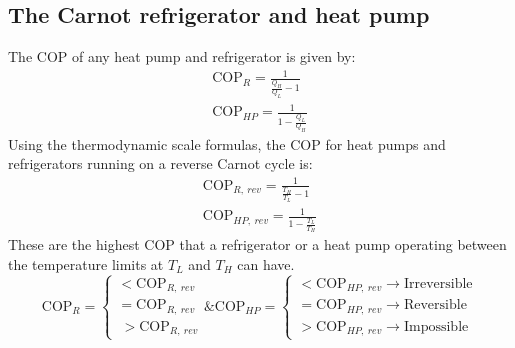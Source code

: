 \subsection{The Carnot refrigerator and heat pump}
The COP of any heat pump and refrigerator is given by:
\begin{align}
  \textrm{COP}_R = \frac{1}{\frac{Q_H}{Q_L} - 1} \\
  \textrm{COP}_{HP} = \frac{1}{1 - \frac{Q_L}{Q_H}}
\end{align}
Using the thermodynamic scale formulas, the COP for heat pumps and refrigerators running on a reverse Carnot cycle is:
\begin{align}
  \textrm{COP}_{R, \ rev} = \frac{1}{\frac{T_H}{T_L} - 1} \\
  \textrm{COP}_{HP, \ rev} = \frac{1}{1 - \frac{T_L}{T_H}}
\end{align}
These are the highest COP that a refrigerator or a heat pump operating between the temperature limits at $T_L$ and $T_H$ can have.
\begin{equation}
  \textrm{COP}_{R} =
  \begin{cases}
    < \textrm{COP}_{R, \ rev} \\
    = \textrm{COP}_{R, \ rev} \\\
    > \textrm{COP}_{R, \ rev}
  \end{cases}
  \textrm{\& COP}_{HP} =
  \begin{cases}
    < \textrm{COP}_{HP, \ rev} \rightarrow \textrm{Irreversible} \\
    = \textrm{COP}_{HP, \ rev} \rightarrow \textrm{Reversible}   \\
    > \textrm{COP}_{HP, \ rev} \rightarrow \textrm{Impossible}
  \end{cases}
\end{equation}